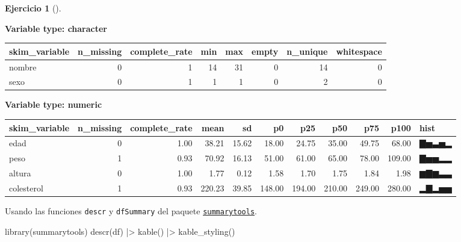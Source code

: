 \documentclass[
  a4paper,
]{scrreport}
\newenvironment{Shaded}{\begin{snugshade}}{\end{snugshade}}
\newcommand{\FunctionTok}[1]{\textcolor[rgb]{0.28,0.35,0.67}{#1}}
\newcommand{\NormalTok}[1]{\textcolor[rgb]{0.00,0.23,0.31}{#1}}
\newcommand{\SpecialCharTok}[1]{\textcolor[rgb]{0.37,0.37,0.37}{#1}}
\theoremstyle{definition}
\newtheorem{exercise}{Ejercicio}[chapter]
\theoremstyle{remark}
\begin{document}
\begin{exercise}[]
\begin{enumerate}
\begin{tcolorbox}
  \textbf{Variable type: character}

  \begin{tabular}{l|r|r|r|r|r|r|r}
  \hline
  skim\_variable & n\_missing & complete\_rate & min & max & empty & n\_unique & whitespace\\
  \hline
  nombre & 0 & 1 & 14 & 31 & 0 & 14 & 0\\
  \hline
  sexo & 0 & 1 & 1 & 1 & 0 & 2 & 0\\
  \hline
  \end{tabular}

  \textbf{Variable type: numeric}

  \begin{tabular}{l|r|r|r|r|r|r|r|r|r|l}
  \hline
  skim\_variable & n\_missing & complete\_rate & mean & sd & p0 & p25 & p50 & p75 & p100 & hist\\
  \hline
  edad & 0 & 1.00 & 38.21 & 15.62 & 18.00 & 24.75 & 35.00 & 49.75 & 68.00 & ▇▅▃▅▂\\
  \hline
  peso & 1 & 0.93 & 70.92 & 16.13 & 51.00 & 61.00 & 65.00 & 78.00 & 109.00 & ▇▅▅▂▂\\
  \hline
  altura & 0 & 1.00 & 1.77 & 0.12 & 1.58 & 1.70 & 1.75 & 1.84 & 1.98 & ▆▇▆▃▃\\
  \hline
  colesterol & 1 & 0.93 & 220.23 & 39.85 & 148.00 & 194.00 & 210.00 & 249.00 & 280.00 & ▂▇▂▅▅\\
  \hline
  \end{tabular}

  \end{tcolorbox}

  \begin{tcolorbox}[enhanced jigsaw, coltitle=black, left=2mm, colback=white, leftrule=.75mm, toptitle=1mm, breakable, bottomrule=.15mm, titlerule=0mm, bottomtitle=1mm, title=\textcolor{quarto-callout-tip-color}{\faLightbulb}\hspace{0.5em}{Solución 4}, arc=.35mm, toprule=.15mm, rightrule=.15mm, colframe=quarto-callout-tip-color-frame, opacityback=0, colbacktitle=quarto-callout-tip-color!10!white, opacitybacktitle=0.6]

  Usando las funciones \texttt{descr} y \texttt{dfSummary} del paquete
  \href{https://cran.r-project.org/web/packages/summarytools/vignettes/introduction.html}{\texttt{summarytools}}.

\begin{Shaded}
\begin{Highlighting}[]
\FunctionTok{library}\NormalTok{(summarytools)}
\FunctionTok{descr}\NormalTok{(df) }\SpecialCharTok{|\textgreater{}}
\FunctionTok{kable}\NormalTok{() }\SpecialCharTok{|\textgreater{}}
\FunctionTok{kable\_styling}\NormalTok{()}
\end{Highlighting}
\end{Shaded}


\end{tcolorbox}
\end{enumerate}
\end{exercise}
\end{document}
